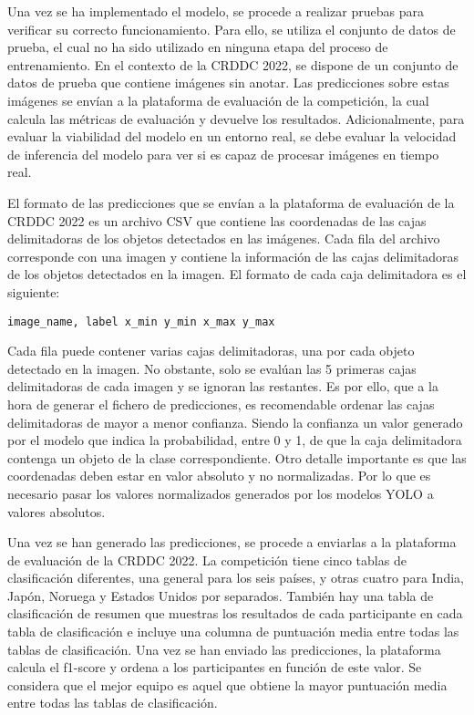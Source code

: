 Una vez se ha implementado el modelo, se procede a realizar pruebas para verificar su correcto funcionamiento. Para ello, se utiliza el conjunto de datos de prueba, el cual no ha sido utilizado en ninguna etapa del proceso de entrenamiento. En el contexto de la CRDDC 2022, se dispone de un conjunto de datos de prueba que contiene imágenes sin anotar. Las predicciones sobre estas imágenes se envían a la plataforma de evaluación de la competición, la cual calcula las métricas de evaluación y devuelve los resultados. Adicionalmente, para evaluar la viabilidad del modelo en un entorno real, se debe evaluar la velocidad de inferencia del modelo para ver si es capaz de procesar imágenes en tiempo real.

El formato de las predicciones que se envían a la plataforma de evaluación de la CRDDC 2022 es un archivo CSV que contiene las coordenadas de las cajas delimitadoras de los objetos detectados en las imágenes. Cada fila del archivo corresponde con una imagen y contiene la información de las cajas delimitadoras de los objetos detectados en la imagen. El formato de cada caja delimitadora es el siguiente:

\begin{center}
    \texttt{image\_name, label x\_min y\_min x\_max y\_max}
\end{center}

Cada fila puede contener varias cajas delimitadoras, una por cada objeto detectado en la imagen. No obstante, solo se evalúan las 5 primeras cajas delimitadoras de cada imagen y se ignoran las restantes. Es por ello, que a la hora de generar el fichero de predicciones, es recomendable ordenar las cajas delimitadoras de mayor a menor confianza. Siendo la confianza un valor generado por el modelo que indica la probabilidad, entre 0 y 1, de que la caja delimitadora contenga un objeto de la clase correspondiente. Otro detalle importante es que las coordenadas deben estar en valor absoluto y no normalizadas. Por lo que es necesario pasar los valores normalizados generados por los modelos YOLO a valores absolutos.

Una vez se han generado las predicciones, se procede a enviarlas a la plataforma de evaluación de la CRDDC 2022. La competición tiene cinco tablas de clasificación diferentes, una general para los seis países, y otras cuatro para India, Japón, Noruega y Estados Unidos por separados. También hay una tabla de clasificación de resumen que muestras los resultados de cada participante en cada tabla de clasificación e incluye una columna de puntuación media entre todas las tablas de clasificación. Una vez se han enviado las predicciones, la plataforma calcula el f1-score y ordena a los participantes en función de este valor. Se considera que el mejor equipo es aquel que obtiene la mayor puntuación media entre todas las tablas de clasificación.

